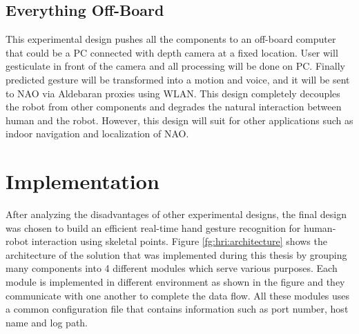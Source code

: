 

\subsection{Everything Off-Board} This experimental design pushes all the components to an off-board computer that could be a PC connected with depth camera at a fixed location. User will gesticulate in front of the camera and all processing will be done on PC. Finally predicted gesture will be transformed into a motion and voice, and it will be sent to NAO via Aldebaran proxies using WLAN. This design completely decouples the robot from other components and degrades the natural interaction between human and the robot. However, this design will suit for other applications such as indoor navigation and localization of NAO.

\section{Implementation} \label{sec:sol:impl} After analyzing the disadvantages of other experimental designs, the final design was chosen to build an efficient real-time hand gesture recognition for human-robot interaction using skeletal points. Figure \ref{fg:hri:architecture} shows the architecture of the solution that was implemented during this thesis by grouping many components into 4 different modules which serve various purposes. Each module is implemented in different environment as shown in the figure and they communicate with one another to complete the data flow. All these modules uses a common configuration file that contains information such as port number, host name and log path.



%
% 






%
%













